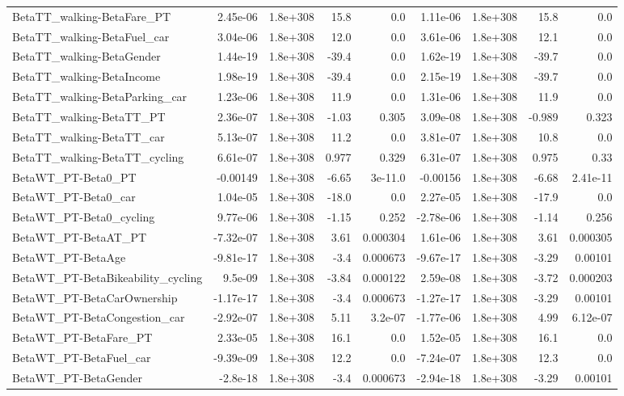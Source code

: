 \begin{tabular}{lrrrrrrrr}
BetaTT_walking-BetaFare_PT & 2.45e-06 & 1.8e+308 & 15.8 & 0.0 & 1.11e-06 & 1.8e+308 & 15.8 & 0.0 \\
BetaTT_walking-BetaFuel_car & 3.04e-06 & 1.8e+308 & 12.0 & 0.0 & 3.61e-06 & 1.8e+308 & 12.1 & 0.0 \\
BetaTT_walking-BetaGender & 1.44e-19 & 1.8e+308 & -39.4 & 0.0 & 1.62e-19 & 1.8e+308 & -39.7 & 0.0 \\
BetaTT_walking-BetaIncome & 1.98e-19 & 1.8e+308 & -39.4 & 0.0 & 2.15e-19 & 1.8e+308 & -39.7 & 0.0 \\
BetaTT_walking-BetaParking_car & 1.23e-06 & 1.8e+308 & 11.9 & 0.0 & 1.31e-06 & 1.8e+308 & 11.9 & 0.0 \\
BetaTT_walking-BetaTT_PT & 2.36e-07 & 1.8e+308 & -1.03 & 0.305 & 3.09e-08 & 1.8e+308 & -0.989 & 0.323 \\
BetaTT_walking-BetaTT_car & 5.13e-07 & 1.8e+308 & 11.2 & 0.0 & 3.81e-07 & 1.8e+308 & 10.8 & 0.0 \\
BetaTT_walking-BetaTT_cycling & 6.61e-07 & 1.8e+308 & 0.977 & 0.329 & 6.31e-07 & 1.8e+308 & 0.975 & 0.33 \\
BetaWT_PT-Beta0_PT & -0.00149 & 1.8e+308 & -6.65 & 3e-11.0 & -0.00156 & 1.8e+308 & -6.68 & 2.41e-11 \\
BetaWT_PT-Beta0_car & 1.04e-05 & 1.8e+308 & -18.0 & 0.0 & 2.27e-05 & 1.8e+308 & -17.9 & 0.0 \\
BetaWT_PT-Beta0_cycling & 9.77e-06 & 1.8e+308 & -1.15 & 0.252 & -2.78e-06 & 1.8e+308 & -1.14 & 0.256 \\
BetaWT_PT-BetaAT_PT & -7.32e-07 & 1.8e+308 & 3.61 & 0.000304 & 1.61e-06 & 1.8e+308 & 3.61 & 0.000305 \\
BetaWT_PT-BetaAge & -9.81e-17 & 1.8e+308 & -3.4 & 0.000673 & -9.67e-17 & 1.8e+308 & -3.29 & 0.00101 \\
BetaWT_PT-BetaBikeability_cycling & 9.5e-09 & 1.8e+308 & -3.84 & 0.000122 & 2.59e-08 & 1.8e+308 & -3.72 & 0.000203 \\
BetaWT_PT-BetaCarOwnership & -1.17e-17 & 1.8e+308 & -3.4 & 0.000673 & -1.27e-17 & 1.8e+308 & -3.29 & 0.00101 \\
BetaWT_PT-BetaCongestion_car & -2.92e-07 & 1.8e+308 & 5.11 & 3.2e-07 & -1.77e-06 & 1.8e+308 & 4.99 & 6.12e-07 \\
BetaWT_PT-BetaFare_PT & 2.33e-05 & 1.8e+308 & 16.1 & 0.0 & 1.52e-05 & 1.8e+308 & 16.1 & 0.0 \\
BetaWT_PT-BetaFuel_car & -9.39e-09 & 1.8e+308 & 12.2 & 0.0 & -7.24e-07 & 1.8e+308 & 12.3 & 0.0 \\
BetaWT_PT-BetaGender & -2.8e-18 & 1.8e+308 & -3.4 & 0.000673 & -2.94e-18 & 1.8e+308 & -3.29 & 0.00101 \\

\end{tabular}
